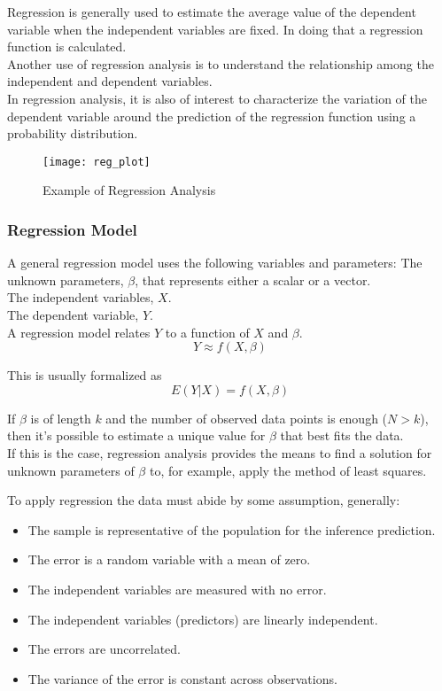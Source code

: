 Regression is generally used to estimate the average value of the dependent variable when the independent variables are fixed. In doing that a regression function is calculated. \\
Another use of regression analysis is to understand the relationship among the independent and dependent variables.\\

In regression analysis, it is also of interest to characterize the variation of the dependent variable around the prediction of the regression function using a probability distribution.

\begin{figure}[H]
	\centering
	\texttt{[image: reg\_plot]}
	\caption{Example of Regression Analysis}
	\label{fig:reg_plot}
\end{figure}	

\subsubsection*{Regression Model} 
A general regression model uses the following variables and parameters:
The unknown parameters, $\beta$, that represents either a scalar or a vector.\\
The independent variables, $X$. \\
The dependent variable, $Y$.\\

A regression model relates $Y$ to a function of $X$ and $\beta$.
\begin{equation}
	Y \approx f(X,\beta)
\end{equation}

This is usually formalized as
\begin{equation}
	E(Y|X) = f(X,\beta)
\end{equation}

If $\beta$ is of length $k$ and the number of observed data points is enough ($N > k$), then it's possible to estimate a unique value for $\beta$ that best fits the data. \\

If this is the case, regression analysis provides the means to find a solution for unknown parameters of $\beta$ to, for example, apply the method of least squares.

To apply regression the data must abide by some assumption, generally:
\begin{itemize}[noitemsep, topsep = -5pt]
	\item The sample is representative of the population for the inference prediction.
	\item The error is a random variable with a mean of zero.
	\item The independent variables are measured with no error.
	\item The independent variables (predictors) are linearly independent.
	\item The errors are uncorrelated.
	\item The variance of the error is constant across observations.
\end{itemize}


